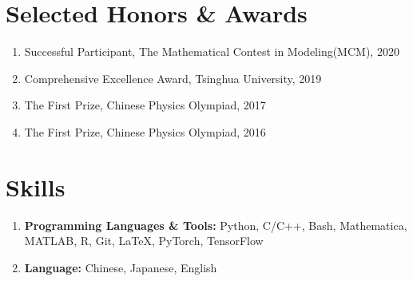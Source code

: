 \documentclass{resume}
\begin{document}
\section{Selected Honors \& Awards}
\begin{enumerate}
    \item Successful Participant, The Mathematical Contest in Modeling(MCM), 2020
    \item Comprehensive Excellence Award, Tsinghua University, 2019
    \item The First Prize, Chinese Physics Olympiad, 2017
    \item The First Prize, Chinese Physics Olympiad, 2016
\end{enumerate}


\section{Skills}
\begin{enumerate}
  \item \textbf{Programming Languages \& Tools:} \small Python, C/C++, Bash, Mathematica, MATLAB, R, Git, \LaTeX, PyTorch, TensorFlow
  \item \textbf{Language:} \small Chinese, Japanese, English 
\end{enumerate}
\end{document}
